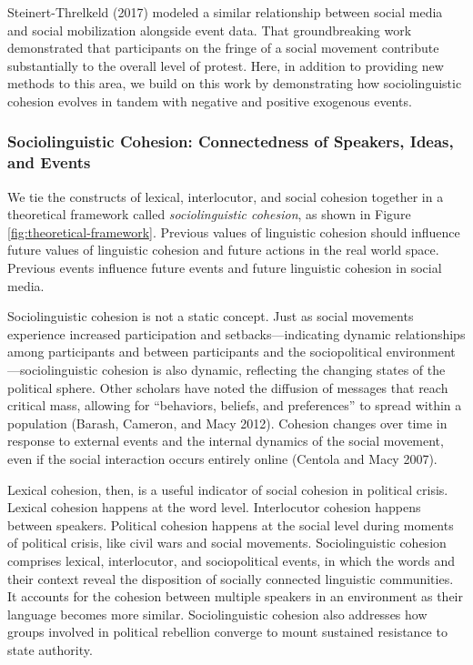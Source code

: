 \documentclass[english,man]{apa6}
\begin{document}
Steinert-Threlkeld (2017) modeled a similar relationship
between social media and social mobilization alongside event data. That
groundbreaking work demonstrated that participants on the fringe of a social
movement contribute substantially to the overall level of protest. Here, in
addition to providing new methods to this area, we build on this work by
demonstrating how sociolinguistic cohesion evolves in tandem with negative and
positive exogenous events.

\hypertarget{sociolinguistic-cohesion-connectedness-of-speakers-ideas-and-events}{%
\subsubsection{Sociolinguistic Cohesion: Connectedness of Speakers, Ideas, and Events}\label{sociolinguistic-cohesion-connectedness-of-speakers-ideas-and-events}}

We tie the constructs of lexical, interlocutor, and social cohesion together in
a theoretical framework called \emph{sociolinguistic cohesion}, as shown in Figure
\ref{fig:theoretical-framework}. Previous values of linguistic cohesion should
influence future values of linguistic cohesion and future actions in the real
world space. Previous events influence future events and future linguistic
cohesion in social media.

Sociolinguistic cohesion is not a static concept. Just as social movements
experience increased participation and setbacks---indicating dynamic
relationships among participants and between participants and the sociopolitical
environment---sociolinguistic cohesion is also dynamic, reflecting the changing
states of the political sphere. Other scholars have noted the diffusion of
messages that reach critical mass, allowing for \enquote{behaviors, beliefs, and
preferences} to spread within a population (Barash, Cameron, and Macy 2012). Cohesion
changes over time in response to external events and the internal dynamics of
the social movement, even if the social interaction occurs entirely
online (Centola and Macy 2007).

Lexical cohesion, then, is a useful indicator of social cohesion in political
crisis. Lexical cohesion happens at the word level. Interlocutor cohesion
happens between speakers. Political cohesion happens at the social level during
moments of political crisis, like civil wars and social movements.
Sociolinguistic cohesion comprises lexical, interlocutor, and sociopolitical
events, in which the words and their context reveal the disposition of socially
connected linguistic communities. It accounts for the cohesion between multiple
speakers in an environment as their language becomes more similar.
Sociolinguistic cohesion also addresses how groups involved in political
rebellion converge to mount sustained resistance to state authority.
\end{document}
